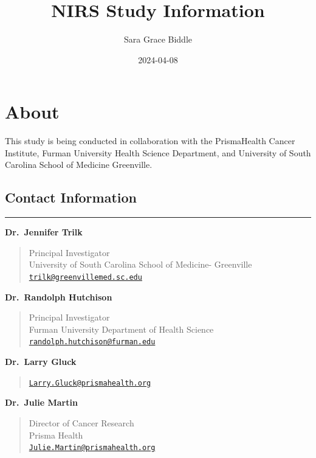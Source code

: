 \documentclass[
]{book}
\title{NIRS Study Information}
\author{Sara Grace Biddle}
\date{2024-04-08}
\begin{document}
\maketitle

{
\setcounter{tocdepth}{1}
\tableofcontents
}
\hypertarget{about}{%
\chapter{About}\label{about}}

This study is being conducted in collaboration with the PrismaHealth Cancer Institute, Furman University Health Science Department, and University of South Carolina School of Medicine Greenville.

\hypertarget{contact-information}{%
\section{Contact Information}\label{contact-information}}

\begin{center}\rule{0.5\linewidth}{0.5pt}\end{center}

\textbf{Dr.~Jennifer Trilk}

\begin{quote}
Principal Investigator\\
University of South Carolina School of Medicine- Greenville\\
\href{mailto:trilk@greenvillemed.sc.edu}{\nolinkurl{trilk@greenvillemed.sc.edu}}
\end{quote}

\textbf{Dr.~Randolph Hutchison}

\begin{quote}
Principal Investigator\\
Furman University Department of Health Science\\
\href{mailto:randolph.hutchison@furman.edu}{\nolinkurl{randolph.hutchison@furman.edu}}
\end{quote}

\textbf{Dr.~Larry Gluck}

\begin{quote}
\href{mailto:Larry.Gluck@prismahealth.org}{\nolinkurl{Larry.Gluck@prismahealth.org}}
\end{quote}

\textbf{Dr.~Julie Martin}

\begin{quote}
Director of Cancer Research\\
Prisma Health\\
\href{mailto:Julie.Martin@prismahealth.org}{\nolinkurl{Julie.Martin@prismahealth.org}}
\end{quote}
\end{document}
